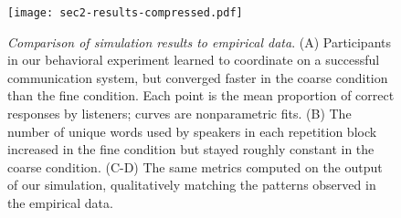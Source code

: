 \begin{figure}[t]
\begin{center}
\texttt{[image: sec2-results-compressed.pdf]}
\vspace{1ex}
\caption{\emph{Comparison of simulation results to empirical data}.  (A) Participants in our behavioral experiment learned to coordinate on a successful communication system, but converged faster in the coarse condition than the fine condition. Each point is the mean proportion of correct responses by listeners; curves are nonparametric fits. (B) The number of unique words used by speakers in each repetition block increased in the fine condition but stayed roughly constant in the coarse condition. (C-D) The same metrics computed on the output of our simulation, qualitatively matching the patterns observed in the empirical data.}
\label{fig:sec2Results}
\end{center}
\end{figure}
%
%

